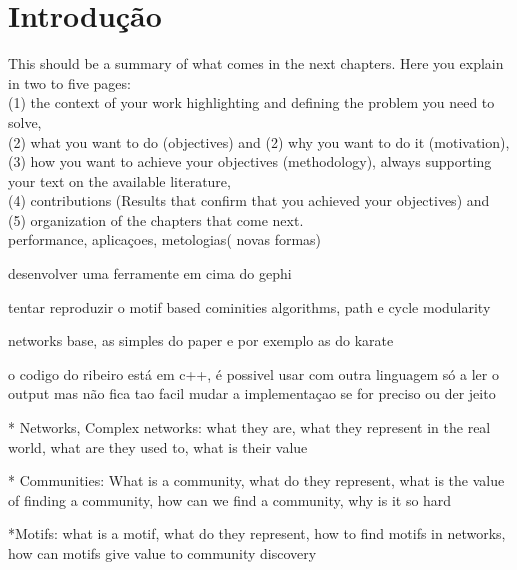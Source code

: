 \chapter{Introdução}\label{chap:intro}
This should be a summary of what comes in the next chapters. Here you explain in two to five
pages: \\(1) the context of your work highlighting and defining the problem you need to solve, \\
(2) what you want to do (objectives) and (2) why you want to do it (motivation), \\
(3) how you want to
achieve your objectives (methodology), always supporting your text on the available literature, \\
(4)
contributions (Results that confirm that you achieved your objectives) and \\
(5) organization of the
chapters that come next.\\

performance, aplicaçoes, metologias( novas formas)

desenvolver uma ferramente em cima do gephi

tentar reproduzir o motif based cominities algorithms, path e cycle modularity

networks base, as simples do paper e por exemplo as do karate

o codigo do ribeiro está em c++, é possivel usar com outra linguagem só a ler o output mas não fica tao facil mudar a implementaçao se for preciso ou der jeito

* Networks, Complex networks: what they are, what they represent in the real world, what are they used to, what is their value

* Communities: What is a community, what do they represent, what is the value of finding a community, how can we find a community, why is it so hard

*Motifs: what is a motif, what do they represent, how to find motifs in networks, how can motifs give value to community discovery




